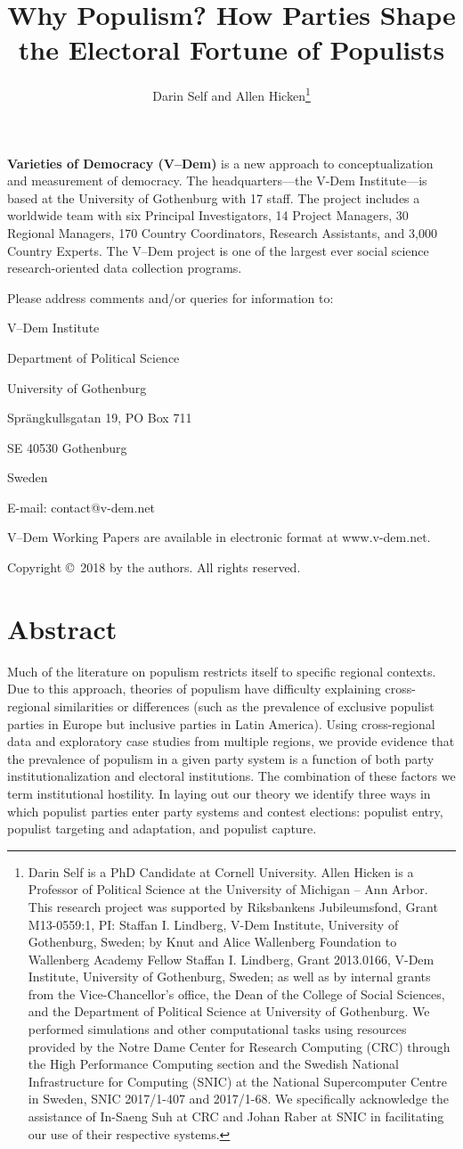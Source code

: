 \documentclass[a4paper,12pt]{article}\usepackage[]{graphicx}\usepackage[]{color}
\title{\Large{\textbf{Why Populism? How Parties Shape the Electoral Fortune of Populists}}}
\author{\normalsize{Darin Self and Allen Hicken}\thanks{Darin Self is a PhD Candidate at Cornell University. Allen Hicken is a Professor of Political Science at the University of Michigan -- Ann Arbor. This research project was supported by Riksbankens Jubileumsfond, Grant M13-0559:1, PI: Staffan I. Lindberg, V-Dem Institute, University of Gothenburg, Sweden; by Knut and Alice Wallenberg Foundation to Wallenberg Academy Fellow Staffan I. Lindberg, Grant 2013.0166, V-Dem Institute, University of Gothenburg, Sweden; as well as by internal grants from the Vice-Chancellor's office, the Dean of the College of Social Sciences, and the Department of Political Science at University of Gothenburg. We performed simulations and other computational tasks using resources provided by the Notre Dame Center for Research Computing (CRC) through the High Performance Computing section and the Swedish National Infrastructure for Computing (SNIC) at the National Supercomputer Centre in Sweden, SNIC 2017/1-407 and 2017/1-68. We specifically acknowledge the assistance of In-Saeng Suh at CRC and Johan Raber at SNIC in facilitating our use of their respective systems.}}
\date{}
\begin{document}
\singlespacing


\noindent \noindent \textbf{Varieties of Democracy (V--Dem)} is a new approach to conceptualization and measurement of democracy. The headquarters---the V-Dem Institute---is based at the University of Gothenburg with 17 staff. The project includes a worldwide team with six Principal Investigators, 14 Project Managers, 30 Regional Managers, 170 Country Coordinators, Research Assistants, and 3,000 Country Experts. The V--Dem project is one of the largest ever social science research-oriented data collection programs.


\vspace{175pt}

\noindent \noindent Please address comments and/or queries for information to:

\medskip
\noindent V--Dem Institute

\medskip
\noindent Department of Political Science 

\medskip
\noindent University of Gothenburg
\medskip

\noindent Spr\"{a}ngkullsgatan 19, PO Box 711
\medskip

\noindent SE 40530 Gothenburg
\medskip

\noindent Sweden
\medskip

\noindent E-mail: contact@v-dem.net



\vspace{250pt}



\noindent V--Dem Working Papers are available in electronic format at www.v-dem.net. 

\medskip
\noindent Copyright \copyright~2018 by the authors. All rights reserved.
\thispagestyle{empty}

\newpage

\maketitle
\thispagestyle{empty}

\newpage
\thispagestyle{empty}
\section*{Abstract}
Much of the literature on populism restricts itself to specific regional contexts. Due to this approach, theories of populism have difficulty explaining cross-regional similarities or differences (such as the prevalence of exclusive populist parties in Europe but inclusive parties in Latin America). Using cross-regional data and exploratory case studies from multiple regions, we provide evidence that the prevalence of populism in a given party system is a function of both party institutionalization and electoral institutions. The combination of these factors we term institutional hostility. In laying out our theory we identify three ways in which populist parties enter party systems and contest elections: populist entry, populist targeting and adaptation, and populist capture.
\end{document}
